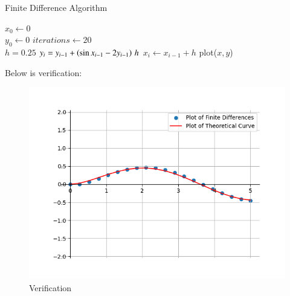 \documentclass[journal]{IEEEtran}
\begin{document}
    
    \begin{algorithm}[!h]
        \caption{Finite Difference Algorithm}
        \begin{algorithmic}
            \STATE {} $x_0 \gets 0$\\
            \STATE $y_0 \gets 0$
            \STATE {} $iterations \gets 20$\\
            \STATE {} $h = 0.25$
                \STATE $\displaystyle y_{i} = y_{i-1} + \left(\sin{x_{i-1}} - 2y_{i-1}\right)\, h$
                \STATE $x_i \gets x_{i-1} + h$
            \ENDFOR
            \STATE plot($x, y$)
        \end{algorithmic}
    \end{algorithm}
    Below is verification:
    \begin{figure}[ht]  
        \centering  
        \includegraphics[width=\columnwidth]{figs/fig1_.png}  
        \caption{Verification}
    \end{figure}


\end{document}
